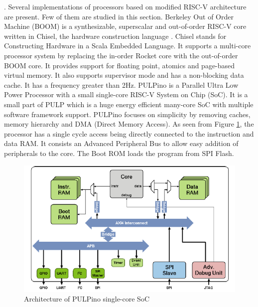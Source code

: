 \cite{riscv_isa_free}.\newline \newline
Several implementations of processors based on modified RISC-V architecture are present. Few of them are studied in this section. Berkeley Out of Order Machine (BOOM) is a synthesizable, superscalar and out-of-order RISC-V core written in Chisel, the hardware construction language
\cite{boom_2015}. Chisel stands for Constructing Hardware in a Scala Embedded Language. It supports a multi-core processor system by replacing the in-order Rocket core with the out-of-order BOOM core. It provides support for floating point, atomics and page-based virtual memory. It also supports supervisor mode and has a non-blocking data cache. It has a frequency greater than 2Hz.\newline \newline
PULPino is a Parallel Ultra Low Power Processor with a small single-core RISC-V System on Chip (SoC). It is a small part of PULP which is a huge energy efficient many-core SoC with multiple software framework support. PULPino focuses on simplicity by removing caches, memory hierarchy and DMA (Direct Memory Access). As seen from Figure \ref{fig:pulpino}, the processor has a single cycle access being directly connected to the instruction and data RAM. It consists an Advanced Peripheral Bus to allow easy addition of peripherals to the core. The Boot ROM loads the program from SPI Flash.

\begin{figure}[h!]
  \includegraphics[width=\linewidth]{figures/pulpino.PNG}
  \caption{Architecture of PULPino single-core SoC
  \cite{pulpino}}
  \label{fig:pulpino}
\end{figure}

